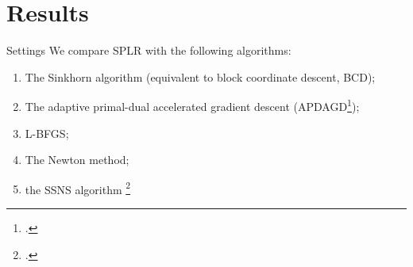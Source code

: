\section{Results}

\begin{frame}{Settings}
    We compare SPLR with the following algorithms:
    \begin{enumerate}
        \item The Sinkhorn algorithm (equivalent to block coordinate descent, BCD);
        \item The adaptive primal-dual accelerated gradient descent (APDAGD\footcite{dvurechensky2018computational});
        \item L-BFGS;
        \item The Newton method;
        \item the SSNS algorithm \footcite{tang2024safe}
    \end{enumerate}
\end{frame}

